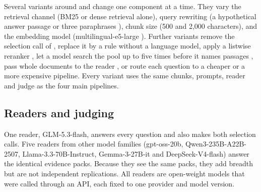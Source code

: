 Several variants around \hybrid{} and \hr{} change one component at a time. They vary the retrieval channel (BM25 or dense retrieval alone), query rewriting (a hypothetical answer passage \citep{gao2023hyde} or three paraphrases \citep{rackauckas2024ragfusion}), chunk size (500 and 2,000 characters), and the embedding model (multilingual-e5-large \citep{wang2024me5}). Further variants remove the selection call of \lexb{}, replace it by a rule without a language model, apply a listwise reranker \citep{sun2023rankgpt,zhuang2024setwise}, let a model search the pool up to five times before it names passages \citep{yao2023react,jin2025searchr1}, pass whole documents to the reader \citep{li2024selfroute,xu2024retrieval}, or route each question to a cheaper or a more expensive pipeline. Every variant uses the same chunks, prompts, reader and judge as the four main pipelines.

\subsection{Readers and judging}
\label{sec:readers}
One reader, GLM-5.3-flash, answers every question and also makes both selection calls. Five readers from other model families (gpt-oss-20b, Qwen3-235B-A22B-2507, Llama-3.3-70B-Instruct, Gemma-3-27B-it and DeepSeek-V4-flash) answer the identical evidence packs. Because they see the same packs, they add breadth but are not independent replications. All readers are open-weight models that were called through an API, each fixed to one provider and model version.

